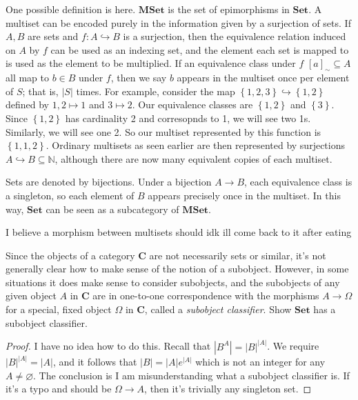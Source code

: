 \documentclass[11pt]{report}
\begin{document}
\begin{solution}
	One possible definition is here. $\mathbf{MSet}$ is the set of epimorphisms in $\mathbf{Set}$. A multiset can be encoded purely in the information given by a surjection of sets. If $A,B$ are sets and $f : A \hookrightarrow  B$ is a surjection, then the equivalence relation induced on  $A$ by $f$ can be used as an indexing set, and the element each set is mapped to is used as the element to be multiplied. If an equivalence class under $f$ $[a]_\sim  \subseteq A$ all map to $b\in B$ under $f$, then  we say $b$ appears in the multiset once per element of $S$; that is, $\left| S \right| $ times. For example, consider the map $\left\{ 1,2,3 \right\} \hookrightarrow  \left\{ 1,2 \right\} $ defined by $1,2\mapsto 1$ and $3\mapsto 2$. Our equivalence classes are $\left\{ 1,2 \right\} $ and $\left\{ 3 \right\} $. Since $\left\{ 1,2 \right\} $ has cardinality 2 and corresopnds to 1, we will see two 1s. Similarly, we will see one 2. So our multiset represented by this function is $\left\{ 1,1,2 \right\} $. Ordinary multisets as seen earlier are then represented by surjections $A\hookrightarrow  B\subseteq \mathbb{N}$, although there are now many equivalent copies of each multiset.

	Sets are denoted by bijections. Under a bijection $A\to B$, each equivalence class is a singleton, so each element of $B$ appears precisely once in the multiset. In this way, $\mathbf{Set}$ can be seen as a subcategory of $\mathbf{MSet}$.

	I believe a morphism between multisets should idk ill come back to it after eating
\end{solution}
\begin{exercise}
	Since the objects of a category $\mathbf{C}$ are not necessarily sets or similar, it's not generally clear how to make sense of the notion of a subobject. However, in some situations it does make sense to consider subobjects, and the subobjects of any given object $A$ in $\mathbf{C}$ are in one-to-one correspondence with the morphisms $A\to \Omega $ for a special, fixed object $\Omega $ in $\mathbf{C}$, called a \emph{subobject classifier}. Show $\mathbf{Set}$ has a subobject classifier.
\end{exercise}
\begin{proof}
	I have no idea how to do this. Recall that $\left| B^A \right| = \left| B \right| ^{\left| A \right| }$. We require $\left| B \right| ^{\left| A \right| }=\left| A \right| $, and it follows that $\left| B \right| =\left| A \right| e^{\left| A \right| }$ which is not an integer for any $A\neq \varnothing$. The conclusion is I am misunderstanding what a subobject classifier is. If it's a typo and should be $\Omega \to A$, then it's trivially any singleton set.
\end{proof}
\end{document}
